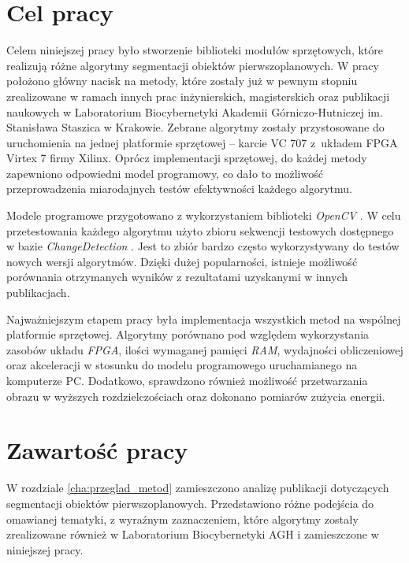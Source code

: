 \section{Cel pracy}
\label{sec:wprowadzenie_cel_pracy}

Celem niniejszej pracy było stworzenie biblioteki modułów sprzętowych, które realizują różne algorytmy segmentacji obiektów pierwszoplanowych. 
W pracy położono główny nacisk na metody, które zostały już w pewnym stopniu zrealizowane w ramach innych prac inżynierskich, magisterskich oraz publikacji naukowych w Laboratorium Biocybernetyki Akademii Górniczo-Hutniczej im. Stanisława Staszica w Krakowie.
Zebrane algorytmy zostały przystosowane do uruchomienia na jednej platformie sprzętowej -- karcie VC 707 z~układem FPGA Virtex 7 firmy Xilinx.
Oprócz implementacji sprzętowej, do każdej metody zapewniono odpowiedni model programowy, co dało to możliwość przeprowadzenia miarodajnych testów efektywności każdego algorytmu.

Modele programowe przygotowano z wykorzystaniem biblioteki \textit{OpenCV} \cite{opencv_17}. 
W celu przetestowania każdego algorytmu użyto zbioru sekwencji testowych dostępnego w bazie \textit{ChangeDetection} \cite{change_detection_web}. 
Jest to zbiór bardzo często wykorzystywany do testów nowych wersji algorytmów. 
Dzięki dużej popularności, istnieje możliwość porównania otrzymanych wyników z rezultatami uzyskanymi w innych publikacjach. 

Najważniejszym etapem pracy była implementacja wszystkich metod na wspólnej platformie sprzętowej. 
Algorytmy porównano pod względem wykorzystania zasobów układu \textit{FPGA}, ilości wymaganej pamięci \textit{RAM}, wydajności obliczeniowej oraz akceleracji w stosunku do modelu programowego uruchamianego na komputerze PC. 
Dodatkowo, sprawdzono również możliwość przetwarzania obrazu w wyższych rozdzielczościach oraz dokonano pomiarów zużycia energii.

\section{Zawartość pracy}
\label{sec:wprowadzenie_zawartosc_pracy}

W rozdziale \ref{cha:przeglad_metod} zamieszczono analizę publikacji dotyczących segmentacji obiektów pierwszoplanowych. 
Przedstawiono różne podejścia do omawianej tematyki, z wyraźnym zaznaczeniem, które algorytmy zostały zrealizowane również w Laboratorium Biocybernetyki AGH i zamieszczone w niniejszej pracy.


